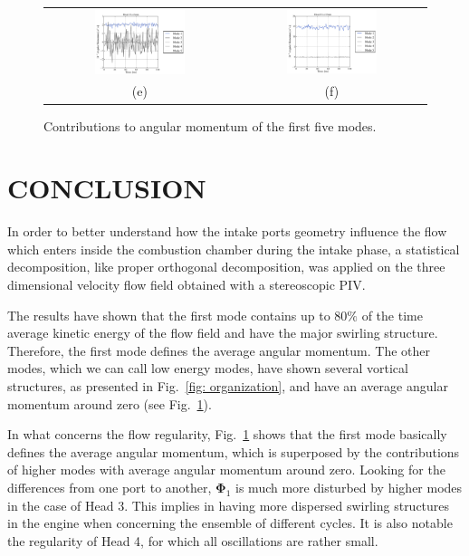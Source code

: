 \documentclass[10pt,fleqn,a4paper]{article}
\newcommand{\bv}[1]{\mathbf{#1}}
\begin{document}
\begin{figure}[h]
\begin{tabular}{cc}
\includegraphics[width=0.5\textwidth]{./imgs/Lz_H4L2.pdf} & \includegraphics[width=0.5\textwidth]{./imgs/Lz_H4L12.pdf} \\
(e) & (f)
\end{tabular}
 \caption{Contributions to angular momentum of the first five modes.}
 \label{fig: Lz}
\end{figure}

\clearpage


\section{CONCLUSION}

In order to better understand how the intake ports geometry influence the flow which enters inside the combustion chamber during the intake phase, a statistical decomposition, like proper orthogonal decomposition, was applied on the three dimensional velocity flow field obtained with a stereoscopic PIV.

The results have shown that the first mode contains up to 80$\%$ of the time average kinetic energy of the flow field and have the major swirling structure. Therefore, the first mode defines the average angular momentum. The other modes, which we can call low energy modes, have shown several vortical structures, as presented in Fig.~\ref{fig: organization}, and have an average angular momentum around zero (see Fig.~\ref{fig: Lz}).

In what concerns the flow regularity, Fig.~\ref{fig: Lz} shows that the first mode basically defines the average angular momentum, which is superposed by the contributions of higher modes with average angular momentum around zero. Looking for the differences from one port to another, $\bv{\Phi}_1$ is much more disturbed by higher modes in the case of Head 3. This implies in having more dispersed swirling structures in the engine when concerning the ensemble of different cycles. It is also notable the regularity of Head 4, for which all oscillations are rather small.
\end{document}
